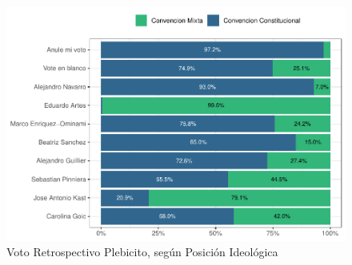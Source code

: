 \documentclass[
  12pt,
]{book}
\begin{document}
\begin{figure}

{\centering \includegraphics{reporte-elsoc_files/figure-latex/presi-voto-c45-1} 

}

\caption{Voto Retrospectivo Plebicito, según Posición Ideológica}\label{fig:presi-voto-c45}
\end{figure}
\end{document}
